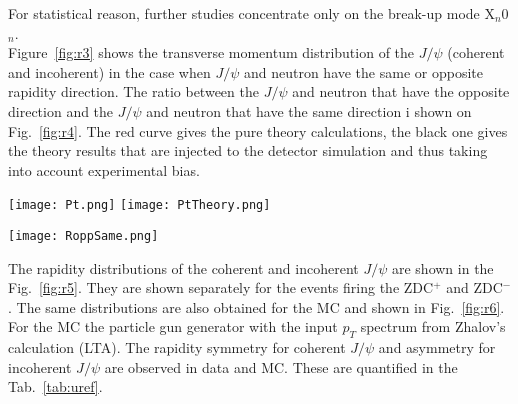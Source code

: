 For statistical reason, further studies concentrate only on the break-up mode X$_{n}$0$_{n}$. \\
Figure~\ref{fig:r3} shows the transverse momentum distribution of the $J/\psi$ (coherent and incoherent) in the case when $J/\psi$ and neutron have the same or opposite rapidity direction. The ratio between the $J/\psi$ and neutron that have the opposite direction and  the $J/\psi$ and neutron that have the same direction i shown on Fig.~\ref{fig:r4}. The red curve gives the pure theory calculations, the black one gives the theory results that are injected to the detector simulation and thus taking into account experimental bias. 
 

\begin{figure*}[!Hhtb]
  \begin{center}
    \texttt{[image: Pt.png]}
        \texttt{[image: PtTheory.png]}


             \caption{
    \label{fig:r3}  
     Transverse momentum distribution of the $J/\psi$ when $J/\psi$ and neutron have the same or opposite rapidity direction from data (left) and from theory (right). 
        }
       \end{center}
\end{figure*}

\begin{figure*}[!Hhtb]
  \begin{center}
    \texttt{[image: RoppSame.png]}\\

             \caption{
    \label{fig:r4}  
     Ratio between the transverse momentum distribution of the $J/\psi$ when  $J/\psi$ and neutron have the opposite direction and the transverse momentum distribution of the $J/\psi$ when  $J/\psi$ and neutron have the same direction. 
        }
       \end{center}
\end{figure*}

The rapidity distributions of the coherent and incoherent $J/\psi$ are shown in the Fig.~\ref{fig:r5}. They are shown separately for the events firing the ZDC$^{+}$ and ZDC$^{-}$. The same distributions are also obtained for the MC and shown in Fig.~\ref{fig:r6}. For the MC the particle gun generator with the input $p_{T}$ spectrum from Zhalov's  calculation (LTA). The rapidity symmetry for coherent $J/\psi$ and asymmetry for incoherent $J/\psi$ are observed in data and MC. These are quantified in the Tab.~\ref{tab:uref}. 


